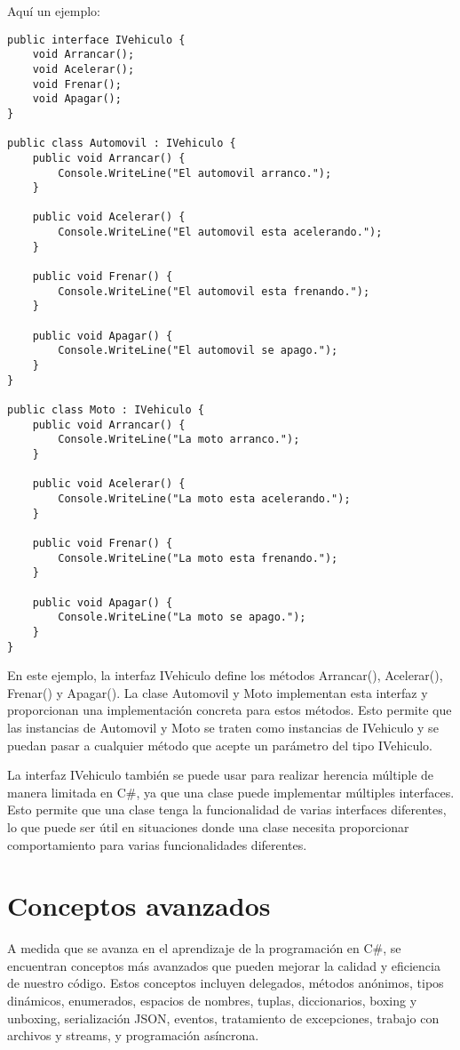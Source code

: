 \documentclass[executivepaper]{article}
\begin{document}
Aquí un ejemplo:
\begin{lstlisting}
public interface IVehiculo {
    void Arrancar();
    void Acelerar();
    void Frenar();
    void Apagar();
}

public class Automovil : IVehiculo {
    public void Arrancar() {
        Console.WriteLine("El automovil arranco.");
    }

    public void Acelerar() {
        Console.WriteLine("El automovil esta acelerando.");
    }

    public void Frenar() {
        Console.WriteLine("El automovil esta frenando.");
    }

    public void Apagar() {
        Console.WriteLine("El automovil se apago.");
    }
}

public class Moto : IVehiculo {
    public void Arrancar() {
        Console.WriteLine("La moto arranco.");
    }

    public void Acelerar() {
        Console.WriteLine("La moto esta acelerando.");
    }

    public void Frenar() {
        Console.WriteLine("La moto esta frenando.");
    }

    public void Apagar() {
        Console.WriteLine("La moto se apago.");
    }
}
\end{lstlisting}

En este ejemplo, la interfaz IVehiculo define los métodos Arrancar(), Acelerar(), Frenar() y Apagar(). La clase Automovil y Moto implementan esta interfaz y proporcionan una implementación concreta para estos métodos. Esto permite que las instancias de Automovil y Moto se traten como instancias de IVehiculo y se puedan pasar a cualquier método que acepte un parámetro del tipo IVehiculo.

La interfaz IVehiculo también se puede usar para realizar herencia múltiple de manera limitada en C\#, ya que una clase puede implementar múltiples interfaces. Esto permite que una clase tenga la funcionalidad de varias interfaces diferentes, lo que puede ser útil en situaciones donde una clase necesita proporcionar comportamiento para varias funcionalidades diferentes.

\newpage
\section{Conceptos avanzados}

A medida que se avanza en el aprendizaje de la programación en C\#, se encuentran conceptos más avanzados que pueden mejorar la calidad y eficiencia de nuestro código. Estos conceptos incluyen delegados, métodos anónimos, tipos dinámicos, enumerados, espacios de nombres, tuplas, diccionarios, boxing y unboxing, serialización JSON, eventos, tratamiento de excepciones, trabajo con archivos y streams, y programación asíncrona.
\end{document}
